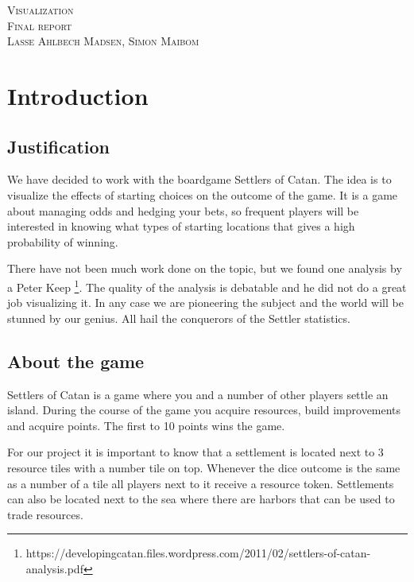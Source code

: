 \documentclass{article}
\begin{document}
\begin{center}
\textsc{\Large Visualization}\\[0.5cm]
\textsc{\large Final report}\\[0.5cm]
\textsc{\large Lasse Ahlbech Madsen, Simon Maibom}\\[0.5cm]
\vspace{1 cm}
\end{center}

\section{Introduction}

\subsection{Justification}

We have decided to work with the boardgame Settlers of Catan. The idea is to
visualize the effects of starting choices on the outcome of the game. It is a
game about managing odds and hedging your bets, so frequent players will be
interested in knowing what types of starting locations that gives a high
probability of winning.

There have not been much work done on the topic, but we found one analysis by a
Peter Keep
\footnote{https://developingcatan.files.wordpress.com/2011/02/settlers-of-catan-analysis.pdf}.
The quality of the analysis is debatable and he did not do a great job
visualizing it. In any case we are pioneering the subject and the world will
be stunned by our genius. All hail the conquerors of the Settler statistics.

\subsection{About the game}

Settlers of Catan is a game where you and a number of other players settle
an island. During the course of the game you acquire resources, build
improvements and acquire points. The first to 10 points wins the game.

For our project it is important to know that a settlement is located next
to 3 resource tiles with a number tile on top. Whenever the dice outcome is
the same as a number of a tile all players next to it receive a resource
token. Settlements can also be located next to the sea where there are harbors
that can be used to trade resources.
\end{document}
